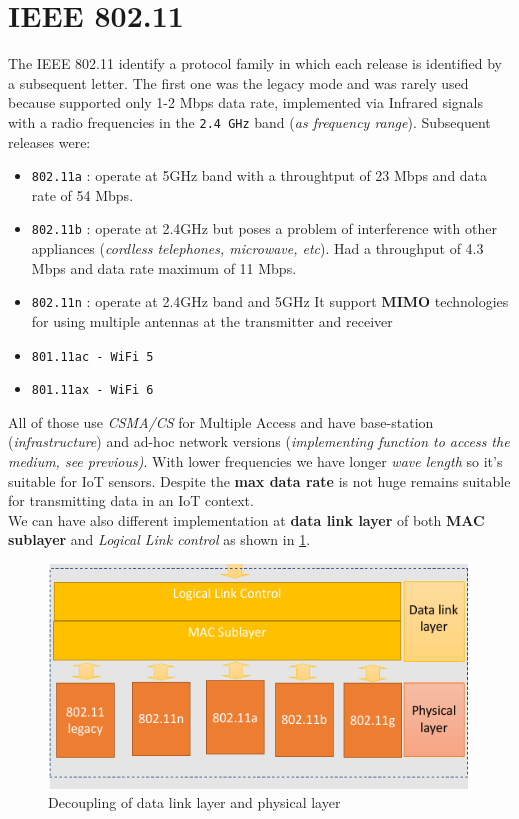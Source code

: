 \documentclass[10pt,a4paper]{report}
\theoremstyle{definition}
\begin{document}
\section{IEEE 802.11}\label{sec:ieee-80211}
The IEEE 802.11 identify a protocol family in which each release is identified by a subsequent letter. The first one was the legacy mode and was rarely used because supported only 1-2 Mbps data rate, implemented via Infrared signals with a radio frequencies in the \texttt{2.4 GHz} band (\textit{as frequency range}). Subsequent releases were:
\begin{itemize}
	\item 
	\texttt{802.11a} : operate at 5GHz band with a throughtput of 23 Mbps and data rate of 54 Mbps.
	\item 
	\texttt{802.11b} : operate at 2.4GHz but poses a problem of interference with other appliances (\textit{cordless telephones, microwave, etc}). Had a throughput of 4.3 Mbps and data rate maximum of 11 Mbps.
	\item 
	\texttt{802.11n} : operate at 2.4GHz band and 5GHz
	It support \textbf{MIMO} technologies for using multiple antennas at the transmitter and receiver
	\item 
	\texttt{801.11ac - WiFi 5}
	\item 
	\texttt{801.11ax - WiFi 6}


\end{itemize}


All of those use \textit{CSMA/CS} for Multiple Access and have base-station (\textit{infrastructure}) and ad-hoc network versions (\textit{implementing function to access the medium, see previous)}. With lower frequencies we have longer \textit{wave length} so it's suitable for IoT sensors. Despite the \textbf{max data rate} is not huge remains suitable for transmitting data in an IoT context.\\
We can have also different implementation at \textbf{data link layer} of both \textbf{MAC sublayer} and \textit{Logical Link control} as shown in \ref{physic-layer}.
\begin{figure}[h]
	\centering\includegraphics[scale=0.50]{images/Pasted image 20230301163319.png}
	\caption{Decoupling of data link layer and physical layer}
	\label{physic-layer}
\end{figure}
\end{document}
